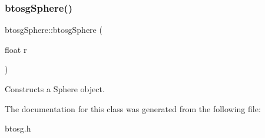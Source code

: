 \subsubsection{\texorpdfstring{btosg\+Sphere()}{btosgSphere()}}
{\footnotesize\ttfamily btosg\+Sphere\+::btosg\+Sphere (\begin{DoxyParamCaption}\item[{float}]{r }\end{DoxyParamCaption})\hspace{0.3cm}{\ttfamily [inline]}}

Constructs a Sphere object. 

The documentation for this class was generated from the following file\+:\begin{DoxyCompactItemize}
\item 
btosg.\+h\end{DoxyCompactItemize}
